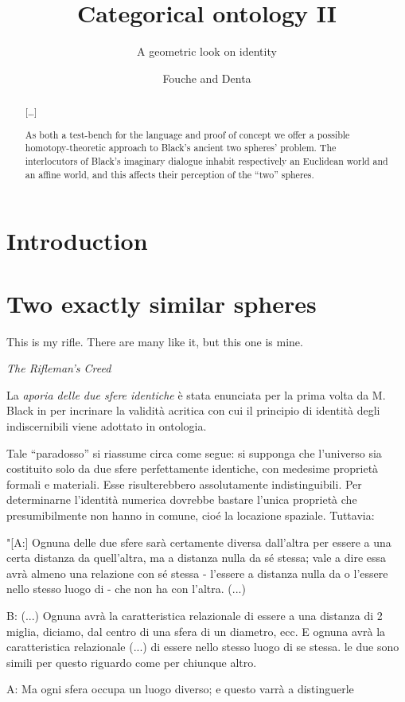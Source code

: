 \documentclass{amsart}
\author{Fouche and Denta}
\title{Categorical ontology II}
\subtitle{A geometric look on identity}
\begin{document}
\maketitle
\begin{abstract}
  [\dots]

  As both a test-bench for the language and proof of concept we offer a possible homotopy-theoretic approach to Black's ancient two spheres' problem. The interlocutors of Black's imaginary dialogue inhabit respectively an Euclidean world and an affine world, and this affects their perception of the ``two'' spheres.
\end{abstract}
\section{Introduction}
\section{Two exactly similar spheres}
\epigraph{This is my rifle. There are many like it, but this one is mine.}{\emph{The Rifleman's Creed}}
La \emph{aporia delle due sfere identiche} è stata enunciata per la prima volta da M. Black in \cite{} per incrinare la validità acritica con cui il principio di identità degli indiscernibili viene adottato in ontologia.

Tale ``paradosso'' si riassume circa come segue: si supponga che l'universo sia costituito solo da due sfere perfettamente identiche, con medesime proprietà formali e materiali. Esse risulterebbero assolutamente indistinguibili. Per determinarne l'identità numerica dovrebbe bastare l'unica proprietà che presumibilmente non hanno in comune, cioé la locazione spaziale. Tuttavia:

"[A:] Ognuna delle due sfere sarà certamente diversa dall'altra per essere a una certa distanza da quell'altra, ma a distanza nulla da sé stessa; vale a dire essa avrà almeno una relazione con sé stessa - l'essere a distanza nulla da o l'essere nello stesso luogo di - che non ha con l'altra. (...)

B: (...) Ognuna avrà la caratteristica relazionale di essere a una distanza di 2 miglia, diciamo, dal centro di una sfera di un diametro, ecc. E ognuna avrà la caratteristica relazionale (...) di essere nello stesso luogo di se stessa. le due sono simili per questo riguardo come per chiunque altro.

A: Ma ogni sfera occupa un luogo diverso; e questo varrà a distinguerle
\end{document}
